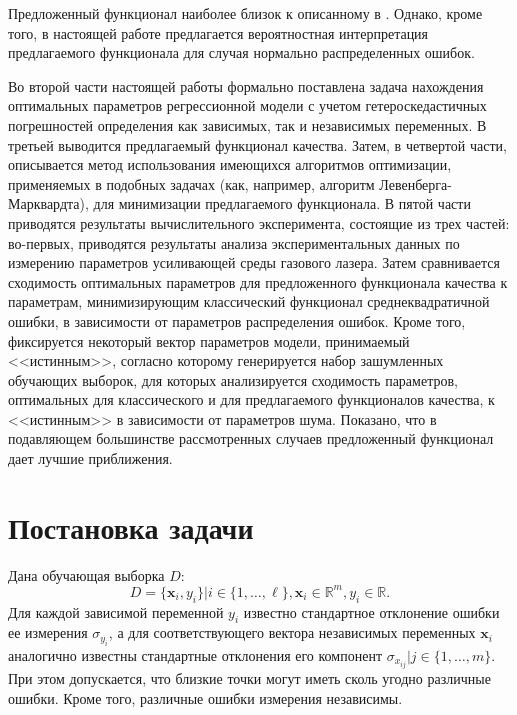 \documentclass[tikz,10pt,a4paper]{article}
\begin{document}
Предложенный функционал наиболее близок к описанному в \cite{Boggs1987Stable}.
Однако, кроме того, в настоящей работе предлагается вероятностная интерпретация
предлагаемого функционала для случая нормально распределенных ошибок.

Во второй части настоящей работы формально поставлена задача нахождения
оптимальных параметров регрессионной модели с учетом гетероскедастичных
погрешностей определения как зависимых, так и независимых переменных.
В третьей выводится предлагаемый функционал качества.
Затем, в четвертой части, описывается метод использования имеющихся
алгоритмов оптимизации, применяемых в подобных задачах (как, например, алгоритм
Левенберга-Марквардта\cite{Marquardt1963Algorithm}), для минимизации
предлагаемого функционала. В пятой части приводятся результаты
вычислительного эксперимента, состоящие из трех частей: во-первых,
приводятся результаты анализа экспериментальных данных по измерению
параметров усиливающей среды газового лазера. Затем сравнивается сходимость
оптимальных параметров для предложенного функционала качества к параметрам,
минимизирующим классический функционал среднеквадратичной ошибки,
в зависимости от параметров
распределения ошибок. Кроме того, фиксируется некоторый вектор параметров
модели, принимаемый <<истинным>>, согласно которому генерируется набор
зашумленных обучающих выборок, для которых анализируется сходимость параметров,
оптимальных для классического и для предлагаемого функционалов качества,
к <<истинным>> в зависимости от параметров шума. Показано, что в подавляющем большинстве
рассмотренных случаев предложенный функционал дает лучшие приближения.

\section{Постановка задачи}

Дана обучающая выборка $D$:
\begin{equation}
  D = \{ \mathbf{x}_i, y_i \} | i \in \{ 1, \dots, \ell \}, \mathbf{x}_i \in \mathbb{R}^m, y_i \in \mathbb{R}.
  \label{eq:d}
\end{equation}
Для каждой зависимой переменной $y_i$ известно
стандартное отклонение ошибки ее измерения $\sigma_{y_i}$, а для соответствующего
вектора независимых переменных $\mathbf{x}_i$ аналогично известны стандартные
отклонения его компонент $\sigma_{x_{ij}} | j \in \{ 1, \dots, m \}$.
При этом допускается, что близкие точки могут иметь сколь угодно различные ошибки.
Кроме того, различные ошибки измерения независимы.
\end{document}
